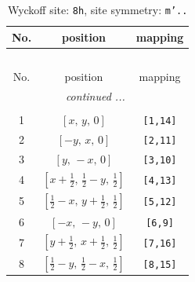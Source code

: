 \documentclass[fleqn,8pt]{jsarticle}
\begin{document}
\begin{longtable}{ccc}
\caption{Wyckoff site: {\tt 8h}, site symmetry: {\tt m'..}}
 \\
 \hline \hline
No. & position & mapping \\ \hline \endfirsthead

\multicolumn{2}{l}{\tablename\ \thetable{}} \\
 \hline \hline
No. & position & mapping \\ \hline \endhead

 \hline \hline
\multicolumn{2}{r}{\footnotesize\it continued ...} \\ \endfoot

 \hline \hline
\multicolumn{2}{r}{} \\ \endlastfoot

1 & $\left[ x,\, y,\, 0 \right]$ & {\tt [1,14]} \\ \hline
2 & $\left[ - y,\, x,\, 0 \right]$ & {\tt [2,11]} \\ \hline
3 & $\left[ y,\, - x,\, 0 \right]$ & {\tt [3,10]} \\ \hline
4 & $\left[ x + \frac{1}{2},\, \frac{1}{2} - y,\, \frac{1}{2} \right]$ & {\tt [4,13]} \\ \hline
5 & $\left[ \frac{1}{2} - x,\, y + \frac{1}{2},\, \frac{1}{2} \right]$ & {\tt [5,12]} \\ \hline
6 & $\left[ - x,\, - y,\, 0 \right]$ & {\tt [6,9]} \\ \hline
7 & $\left[ y + \frac{1}{2},\, x + \frac{1}{2},\, \frac{1}{2} \right]$ & {\tt [7,16]} \\ \hline
8 & $\left[ \frac{1}{2} - y,\, \frac{1}{2} - x,\, \frac{1}{2} \right]$ & {\tt [8,15]} \\
\end{longtable}
\renewcommand{\arraystretch}{1.2}
\end{document}

